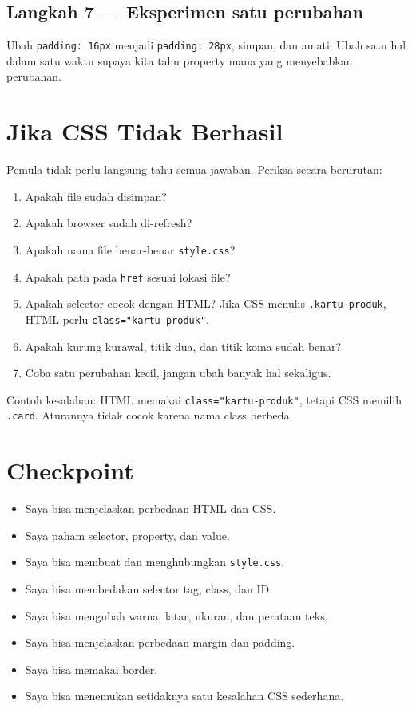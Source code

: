 \documentclass[11pt,a4paper]{article}
\begin{document}
\subsection{Langkah 7 --- Eksperimen satu perubahan}
Ubah \texttt{padding: 16px} menjadi \texttt{padding: 28px}, simpan, dan amati. Ubah satu hal dalam satu waktu supaya kita tahu property mana yang menyebabkan perubahan.

\section{Jika CSS Tidak Berhasil}
Pemula tidak perlu langsung tahu semua jawaban. Periksa secara berurutan:
\begin{enumerate}[leftmargin=*]
\item Apakah file sudah disimpan?
\item Apakah browser sudah di-refresh?
\item Apakah nama file benar-benar \texttt{style.css}?
\item Apakah path pada \texttt{href} sesuai lokasi file?
\item Apakah selector cocok dengan HTML? Jika CSS menulis \texttt{.kartu-produk}, HTML perlu \texttt{class="kartu-produk"}.
\item Apakah kurung kurawal, titik dua, dan titik koma sudah benar?
\item Coba satu perubahan kecil, jangan ubah banyak hal sekaligus.
\end{enumerate}
Contoh kesalahan: HTML memakai \texttt{class="kartu-produk"}, tetapi CSS memilih \texttt{.card}. Aturannya tidak cocok karena nama class berbeda.

\section{Checkpoint}
\begin{itemize}[leftmargin=*]
\item[$\square$] Saya bisa menjelaskan perbedaan HTML dan CSS.
\item[$\square$] Saya paham selector, property, dan value.
\item[$\square$] Saya bisa membuat dan menghubungkan \texttt{style.css}.
\item[$\square$] Saya bisa membedakan selector tag, class, dan ID.
\item[$\square$] Saya bisa mengubah warna, latar, ukuran, dan perataan teks.
\item[$\square$] Saya bisa menjelaskan perbedaan margin dan padding.
\item[$\square$] Saya bisa memakai border.
\item[$\square$] Saya bisa menemukan setidaknya satu kesalahan CSS sederhana.
\end{itemize}
\end{document}
